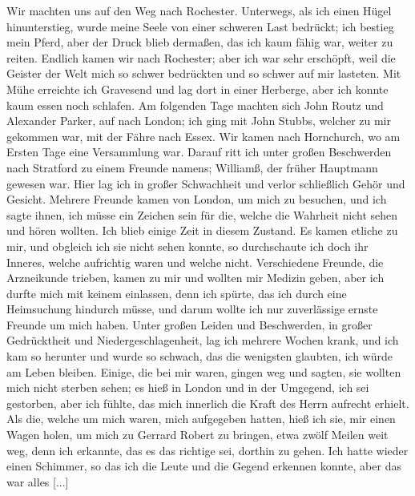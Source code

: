 Wir machten uns auf den Weg nach Rochester. Unterwegs,
als ich einen Hügel hinunterstieg, wurde meine Seele von einer
schweren Last bedrückt; ich bestieg mein Pferd, aber der Druck
blieb dermaßen, das ich kaum fähig war, weiter zu reiten. Endlich
kamen wir nach Rochester; aber ich war sehr erschöpft, weil die
Geister der Welt mich so schwer bedrückten und so schwer auf
mir lasteten. Mit Mühe erreichte ich Gravesend und lag dort
in einer Herberge, aber ich konnte kaum essen noch schlafen. Am
folgenden Tage machten sich John Routz und Alexander Parker,
auf nach London; ich ging mit John Stubbs, welcher zu mir
gekommen war, mit der Fähre nach Essex. Wir kamen nach
Hornchurch, wo am Ersten Tage eine Versammlung war. Darauf
ritt ich unter großen Beschwerden nach Stratford zu einem
Freunde namens; Williamß, der früher Hauptmann gewesen war.
Hier lag ich in großer Schwachheit und verlor schließlich Gehör
und Gesicht. Mehrere Freunde kamen von London, um mich zu
besuchen, und ich sagte ihnen, ich müsse ein Zeichen sein für die,
welche die Wahrheit nicht sehen und hören wollten. Ich blieb
einige Zeit in diesem Zustand. Es kamen etliche zu mir, und
obgleich ich sie nicht sehen konnte, so durchschaute ich doch ihr
Inneres, welche aufrichtig waren und welche nicht. Verschiedene
Freunde, die Arzneikunde trieben, kamen zu mir und wollten mir
Medizin geben, aber ich durfte mich mit keinem einlassen, denn
ich spürte, das ich durch eine Heimsuchung hindurch müsse, und
darum wollte ich nur zuverlässige ernste Freunde um mich haben.
Unter großen Leiden und Beschwerden, in großer Gedrücktheit und
Niedergeschlagenheit, lag ich mehrere Wochen krank, und ich kam
so herunter und wurde so schwach, das die wenigsten glaubten,
ich würde am Leben bleiben. Einige, die bei mir waren, gingen
weg und sagten, sie wollten mich nicht sterben sehen; es hieß in
London und in der Umgegend, ich sei gestorben, aber ich fühlte,
das mich innerlich die Kraft des Herrn aufrecht erhielt. Als die,
welche um mich waren, mich aufgegeben hatten, hieß ich sie, mir
einen Wagen holen, um mich zu Gerrard Robert zu bringen,
etwa zwölf Meilen weit weg, denn ich erkannte, das es das
richtige sei, dorthin zu gehen. Ich hatte wieder einen Schimmer,
so das ich die Leute und die Gegend erkennen konnte, aber das
war alles [...]

